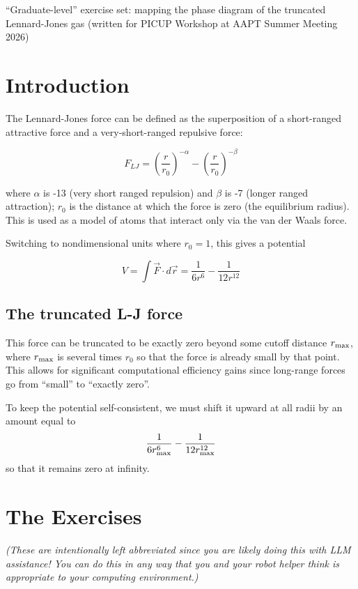 \documentclass[12pt]{article}
\begin{document}
\begin{center}
	\large
``Graduate-level'' exercise set: mapping the phase diagram of the truncated Lennard-Jones gas (written for PICUP Workshop at AAPT Summer Meeting 2026)
\end{center}


\section{Introduction}

The Lennard-Jones force can be defined as the superposition of a short-ranged attractive force and a very-short-ranged repulsive force:

$$F_{LJ} = {\left(\frac{r}{r_0}\right)^{-\alpha}} - {\left(\frac{r}{r_0}\right)^{-\beta}}$$

where $\alpha$ is -13 (very short ranged repulsion) and $\beta$ is -7 (longer ranged attraction); $r_0$ is the distance at which the force is zero (the equilibrium radius). This is used as a model of atoms that interact only via the van der Waals force.

Switching to nondimensional units where $r_0 = 1$, this gives a potential 

$$V = \int \vec F \cdot d\vec r = \frac{1}{6r^6} - \frac{1}{12 r^{12}}$$


\subsection{The truncated L-J force}
This force can be truncated to be exactly zero beyond some cutoff distance $r_{\rm max}$, where $r_{\rm max}$ is several times $r_0$ so that the force is already small by that point. This allows for significant computational efficiency gains since long-range forces go from ``small'' to ``exactly zero''.

To keep the potential self-consistent, we must shift it upward at all radii by an amount equal to $$\frac{1}{6r_{\rm max}^6} - \frac{1}{12 r_{\rm max}^{12}}$$ so that it remains zero at infinity.

\section{The Exercises}

{\it (These are intentionally left abbreviated since you are likely doing this with LLM assistance! You can do this in any way that you and your robot helper think is appropriate to your computing environment.)}
\end{document}
